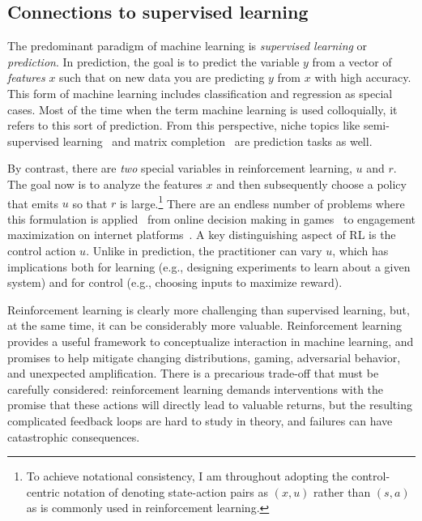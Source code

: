 \documentclass[11pt]{article}
\numberwithin{equation}{section}
\begin{document}
\subsection{Connections to supervised learning}

The predominant paradigm of machine learning is \emph{supervised learning} or \emph{prediction}. In prediction, the goal is to predict the variable $y$ from a vector of \emph{features} $x$ such that on new data you are predicting $y$ from $x$ with high accuracy. This form of machine learning includes classification and regression as special cases. Most of the time when the term machine learning is used colloquially, it refers to this sort of prediction. From this perspective, niche topics like semi-supervised learning~\cite{Zhu-semi-sup} and matrix completion~\cite{hazan2012near} are prediction tasks as well.

By contrast,  there are \emph{two} special variables in reinforcement learning, $u$ and $r$. The goal now is to analyze the features $x$ and then subsequently choose a policy that emits $u$ so that $r$ is large.\footnote{To achieve notational consistency, I am throughout adopting the control-centric notation of denoting state-action pairs as $(x,u)$ rather than $(s,a)$ as is commonly used in reinforcement learning.} There are an endless number of problems where this formulation is applied~\cite{bertsekas1996neuro,kaelbling1996reinforcement,SuttonBartoBook} from online decision making in games~\cite{bowling2015heads,mnih2015human,silver2016mastering,tesauro1995td} to engagement maximization on internet platforms~\cite{bottou2013counterfactual,strehl2010learning}. A key distinguishing aspect of RL is the control action $u$. Unlike in prediction, the practitioner can vary $u$, which has implications both for learning (e.g., designing experiments to learn about a given system) and for control (e.g., choosing inputs to maximize reward).

Reinforcement learning is clearly more challenging than supervised learning, but, at the same time, it can be considerably more valuable. Reinforcement learning provides a useful framework to conceptualize interaction in machine learning, and promises to help mitigate changing distributions, gaming, adversarial behavior, and unexpected amplification. There is a precarious trade-off that must be carefully considered:  reinforcement learning demands interventions with the promise that these actions will directly lead to valuable returns, but the resulting complicated feedback loops are hard to study in theory, and failures can have catastrophic consequences. 
\end{document}

